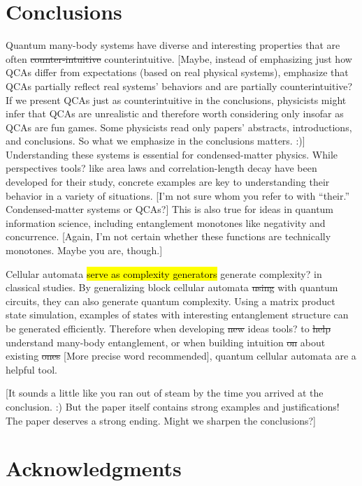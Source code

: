 \documentclass[11pt]{article}
\newcommand{\nicole}[1]{{\color{Green}#1}}
\begin{document}
\begin{multicols}{2}
\section*{Conclusion\nicole{s}}

Quantum many-body systems have diverse and interesting properties that are often \sout{counter-intuitive} \nicole{counterintuitive.} 
\nicole{[Maybe, instead of emphasizing just how QCAs differ from expectations (based on real physical systems), emphasize that QCAs partially reflect real systems' behaviors and are partially counterintuitive? If we present QCAs just as counterintuitive in the conclusions, physicists might infer that QCAs are unrealistic and therefore worth considering only insofar as QCAs are fun games. Some physicists read only papers' abstracts, introductions, and conclusions. So what we emphasize in the conclusions matters. :)]}
Understanding these systems is essential for condensed\nicole{-}matter physics. While perspectives \nicole{tools?} like area laws and correlation-length decay have been developed for their study, concrete examples are key to understanding their behavior in a variety of situations. 
\nicole{[I'm not sure whom you refer to with ``their.'' Condensed-matter systems or QCAs?]}
This is also true for ideas in quantum information science, including entanglement monotones like negativity and concurrence. \nicole{[Again, I'm not certain whether these functions are technically monotones. Maybe you are, though.]}

Cellular automata \hl{serve as complexity generators} \nicole{generate complexity?} in classical studies. By generalizing block cellular automata \sout{using} \nicole{with} quantum circuits\nicole{,} they can also generate quantum complexity.
Using a matrix product state simulation, examples of states with interesting entanglement structure can be generated efficiently. Therefore when developing \sout{new} ideas \nicole{tools?} to \sout{help} understand many-body entanglement, or \nicole{when} building intuition \sout{on} \nicole{about} existing \sout{ones} \nicole{[More precise word recommended]}, quantum cellular automata are a helpful tool.

\nicole{[It sounds a little like you ran out of steam by the time you arrived at the conclusion. :) But the paper itself contains strong examples and justifications! The paper deserves a strong ending. Might we sharpen the conclusions?]}

\section*{Acknowledgments}


\end{multicols}
\end{document}
